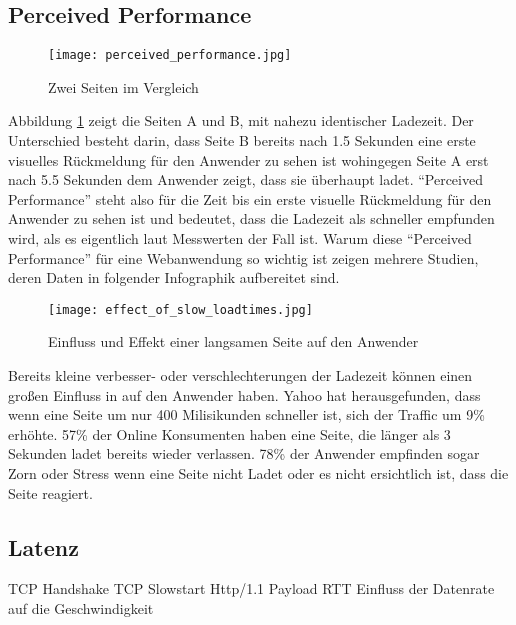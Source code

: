 		\pagebreak
	

	\subsection{Perceived Performance} %
	\label{sub:perceived_performance}
		\begin{figure}[htbp]
			\begin{center}
				\texttt{[image: perceived\_performance.jpg]}
				\caption{Zwei Seiten im Vergleich}
				\label{fig:perceived_performance}
			\end{center}
		\end{figure}

		Abbildung \ref{fig:perceived_performance} zeigt die Seiten A und B, mit nahezu identischer Ladezeit. Der Unterschied besteht darin, dass Seite B bereits nach 1.5 Sekunden eine erste visuelles Rückmeldung für den Anwender zu sehen ist wohingegen Seite A erst nach 5.5 Sekunden dem Anwender zeigt, dass sie überhaupt ladet.
		"`Perceived Performance"' steht also für die Zeit bis ein erste visuelle Rückmeldung für den Anwender zu sehen ist und bedeutet, dass die Ladezeit als schneller empfunden wird, als es eigentlich laut Messwerten der Fall ist. Warum diese "`Perceived Performance"' für eine Webanwendung so wichtig ist zeigen mehrere Studien, deren Daten in folgender Infographik aufbereitet sind.

		\begin{figure}[htbp]
			\begin{center}
				\texttt{[image: effect\_of\_slow\_loadtimes.jpg]}
				\caption{Einfluss und Effekt einer langsamen Seite auf den Anwender \autocite[p. 8]{radware14}\autocite{nng93}}
				\label{fig:effect_of_slow_loadtimes}
			\end{center}
		\end{figure}

		Bereits kleine verbesser- oder verschlechterungen der Ladezeit können einen großen Einfluss in auf den Anwender haben. Yahoo hat herausgefunden, dass wenn eine Seite um nur 400 Milisikunden schneller ist, sich der Traffic um 9\% erhöhte.\autocite{stefanov08} 57\% der Online Konsumenten haben eine Seite, die länger als 3 Sekunden ladet bereits wieder verlassen. 78\% der Anwender empfinden sogar Zorn oder Stress wenn eine Seite nicht Ladet oder es nicht ersichtlich ist, dass die Seite reagiert.


	\subsection{Latenz}
	\label{sub:latenz}
		TCP Handshake
		TCP Slowstart
		Http/1.1
		Payload
		RTT
		Einfluss der Datenrate auf die Geschwindigkeit

		

	
